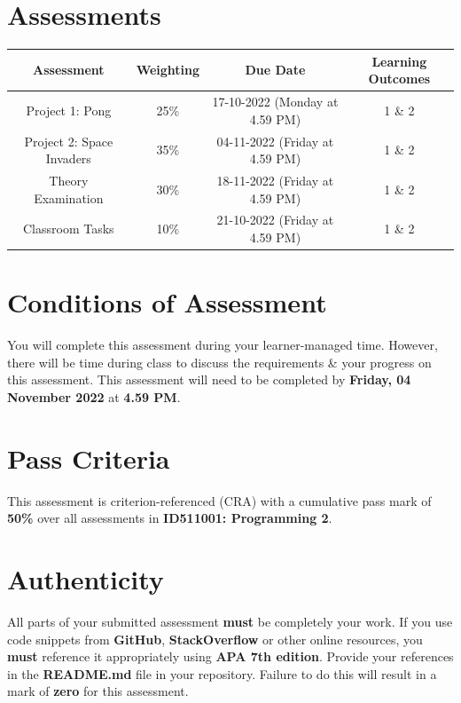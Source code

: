 \documentclass{article}
\begin{document}
\section*{Assessments}
\renewcommand{\arraystretch}{1.5}
\begin{tabular}{|c|c|c|c|}
	\hline
	\textbf{Assessment}                                 & \textbf{Weighting} & \textbf{Due Date}            & \textbf{Learning Outcomes} \\ \hline
	\small Project 1: Pong & \small 25\%        & \small 17-10-2022 (Monday at 4.59 PM)   & \small 1 \& 2                   \\ \hline
	\small Project 2: Space Invaders & \small 35\%        & \small 04-11-2022 (Friday at 4.59 PM)   & \small 1 \& 2                   \\ \hline
	\small Theory Examination                        & \small 30\%        & \small 18-11-2022 (Friday at 4.59 PM)  & \small 1 \& 2                   \\ \hline
	\small Classroom Tasks                       & \small 10\%        & \small 21-10-2022 (Friday at 4.59 PM)  & \small 1 \& 2                   \\ \hline
\end{tabular}

\section*{Conditions of Assessment}
You will complete this assessment during your learner-managed time. However, there will be time during class to discuss the requirements \& your progress on this assessment. This assessment will need to be completed by \textbf{Friday, 04 November 2022} at \textbf{4.59 PM}.

\section*{Pass Criteria}
This assessment is criterion-referenced (CRA) with a cumulative pass mark of \textbf{50\%} over all assessments in \textbf{ID511001: Programming 2}.

\section*{Authenticity}
All parts of your submitted assessment \textbf{must} be completely your work. If you use code snippets from \textbf{GitHub}, \textbf{StackOverflow} or other online resources, you \textbf{must} reference it appropriately using \textbf{APA 7th edition}. Provide your references in the \textbf{README.md} file in your repository. Failure to do this will result in a mark of \textbf{zero} for this assessment.
\end{document}
